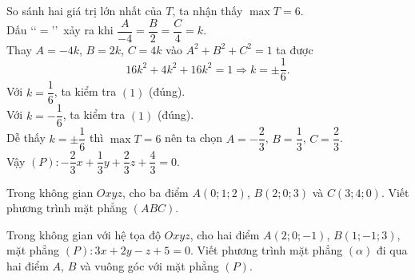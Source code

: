 \begin{bt}
{\begin{itemize}
		\end{itemize}
		So sánh hai giá trị lớn nhất của $T$, ta nhận thấy $\max T=6$.\\
		Dấu \lq\lq$=$\rq\rq\, xảy ra khi $\dfrac{A}{-4}=\dfrac{B}{2}=\dfrac{C}{4}=k$.\\
		Thay $A=-4k$, $B=2k$, $C=4k$ vào $A^2+B^2+C^2=1$ ta được
		$$16k^2+4k^2+16k^2=1\Rightarrow k=\pm \dfrac{1}{6}.$$
		Với $k=\dfrac{1}{6}$, ta kiểm tra $(1)$ (đúng).\\
		Với $k=-\dfrac{1}{6}$, ta kiểm tra $(1)$ (đúng).\\
		Dễ thấy $k=\pm \dfrac{1}{6}$ thì $\max T=6$ nên ta chọn $A=-\dfrac{2}{3}$, $B=\dfrac{1}{3}$, $C=\dfrac{2}{3}$.\\
		Vậy $(P)\colon -\dfrac{2}{3}x+\dfrac{1}{3}y+\dfrac{2}{3}z+\dfrac{4}{3}=0$.
	}
\end{bt}

\begin{bt}%
	Trong không gian $Oxyz$, cho ba điểm $A(0;1;2)$, $B(2;0;3)$ và $C(3;4;0)$. Viết phương trình mặt phẳng $(ABC)$.
\end{bt}

\begin{bt}%
	Trong không gian với hệ tọa độ $Oxyz$, cho hai điểm $A(2;0;-1)$, $B(1;-1;3)$, mặt phẳng $(P)\colon 3x+2y-z+5=0$. Viết phương trình mặt phẳng $(\alpha)$ đi qua hai điểm $A$, $B$ và vuông góc với mặt phẳng $(P)$.
\end{bt}

